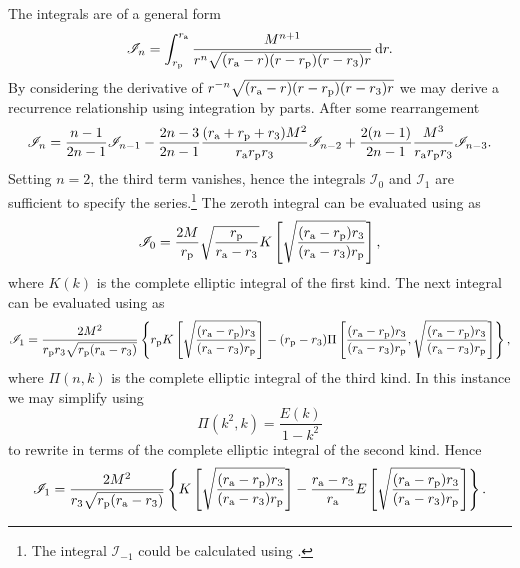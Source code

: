The integrals are of a general form
\begin{equation}
\mathscr{I}_n = \int_{r_\mathrm{p}}^{r_\mathrm{a}}{\frac{M^{n+1}}{r^n\sqrt{(r_\mathrm{a} - r)(r - r_\mathrm{p})(r - r_3)r}}}\,\mathrm{d}{r}.
\end{equation}
By considering the derivative of $r^{-n}\sqrt{(r_\mathrm{a} - r)(r - r_\mathrm{p})(r - r_3)r}$ we may derive a recurrence relationship using integration by parts. After some rearrangement
\begin{equation}
\mathscr{I}_n = \frac{n - 1}{2n - 1}\mathscr{I}_{n-1} - \frac{2n - 3}{2n - 1} \frac{(r_\mathrm{a} + r_\mathrm{p} + r_3)M^2}{r_\mathrm{a}r_\mathrm{p}r_3}\mathscr{I}_{n-2} + \frac{2(n - 1)}{2n-1}\frac{M^3}{r_\mathrm{a}r_\mathrm{p}r_3}\mathscr{I}_{n-3}.
\end{equation}
Setting $n = 2$, the third term vanishes, hence the integrals $\mathscr{I}_0$ and $\mathscr{I}_1$ are sufficient to specify the series.\footnote{The integral $\mathscr{I}_{-1}$ could be calculated using \citet[3.148.6]{Gradshteyn2000}.} The zeroth integral can be evaluated using \citet[3.147.6]{Gradshteyn2000} as
\begin{equation}
\mathscr{I}_0 = \frac{2M}{r_\mathrm{p}}\sqrt{\frac{r_\mathrm{p}}{r_\mathrm{a} - r_3}}K\left[\sqrt{\frac{(r_\mathrm{a} - r_\mathrm{p})r_3}{(r_\mathrm{a} - r_3)r_\mathrm{p}}}\right],
\end{equation}
where $K(k)$ is the complete elliptic integral of the first kind. The next integral can be evaluated using \citet[3.149.6]{Gradshteyn2000} as
\begin{equation}
\mathscr{I}_1 = \frac{2M^2}{r_\mathrm{p}r_3\sqrt{r_\mathrm{p}(r_\mathrm{a} - r_3)}}\left\{r_\mathrm{p}K\left[\sqrt{\frac{(r_\mathrm{a} - r_\mathrm{p})r_3}{(r_\mathrm{a} - r_3)r_\mathrm{p}}}\right] - (r_\mathrm{p} - r_3)\Pi\left[\frac{(r_\mathrm{a} - r_\mathrm{p})r_3}{(r_\mathrm{a} - r_3)r_\mathrm{p}}, \sqrt{\frac{(r_\mathrm{a} - r_\mathrm{p})r_3}{(r_\mathrm{a} - r_3)r_\mathrm{p}}}\right]\right\},
\end{equation}
where $\Pi(n,k)$ is the complete elliptic integral of the third kind. In this instance we may simplify using \citet[19.6.2]{Olver2010}
\begin{equation}
\Pi(k^2,k) = \frac{E(k)}{1 - k^2}
\end{equation}
to rewrite in terms of the complete elliptic integral of the second kind. Hence
\begin{equation}
\mathscr{I}_1 = \frac{2M^2}{r_3\sqrt{r_\mathrm{p}(r_\mathrm{a} - r_3)}}\left\{K\left[\sqrt{\frac{(r_\mathrm{a} - r_\mathrm{p})r_3}{(r_\mathrm{a} - r_3)r_\mathrm{p}}}\right] - \frac{r_\mathrm{a} - r_3}{r_\mathrm{a}}E\left[\sqrt{\frac{(r_\mathrm{a} - r_\mathrm{p})r_3}{(r_\mathrm{a} - r_3)r_\mathrm{p}}}\right]\right\}.
\end{equation}


